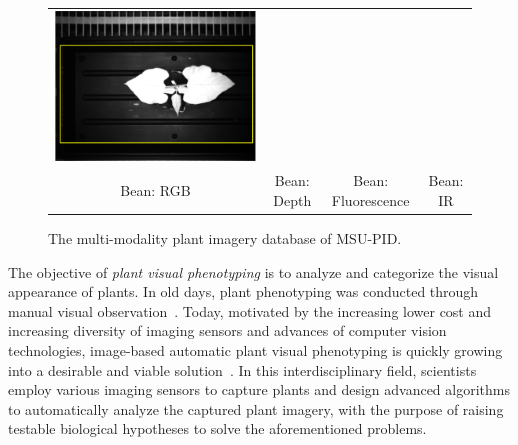 \begin{figure}
\begin{centering}
\begin{tabular}{@{}c c c c}
\includegraphics[width=.23\textwidth]{Figures/FourModalities/B_ir}\\
Bean: RGB & Bean: Depth & Bean: Fluorescence & Bean: IR \\
\end{tabular}
\caption{The multi-modality plant imagery database of MSU-PID. }
\label{fig:fourmodality}
\end{centering}
\end{figure}


The objective of {\it plant visual phenotyping} is to analyze and categorize the visual appearance of plants. %
In old days, plant phenotyping was conducted through manual visual observation~\cite{Erblichkeit1903}.
Today, motivated by the increasing lower cost and increasing diversity of imaging sensors and advances of computer vision technologies, image-based automatic plant visual phenotyping is quickly growing into a desirable and viable solution~\cite{furbank2011phenomics,cruz2015depi}.
In this interdisciplinary field, scientists employ various imaging sensors to capture plants and design advanced algorithms to automatically analyze the captured plant imagery, with the purpose of raising testable biological hypotheses to solve the aforementioned problems.



